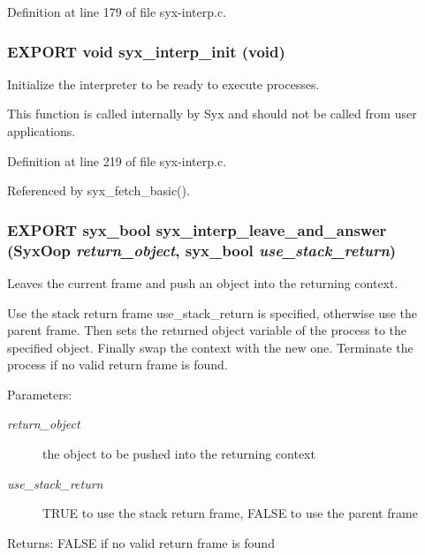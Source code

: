 Definition at line 179 of file syx-interp.c.\hypertarget{syx-interp_8h_dbf95deb73b49620ce9b5c884e6cbcae}{
\subsubsection{\setlength{\rightskip}{0pt plus 5cm}EXPORT void syx\_\-interp\_\-init (void)}}
\label{syx-interp_8h_dbf95deb73b49620ce9b5c884e6cbcae}


Initialize the interpreter to be ready to execute processes.

This function is called internally by Syx and should not be called from user applications. 

Definition at line 219 of file syx-interp.c.

Referenced by syx\_\-fetch\_\-basic().\hypertarget{syx-interp_8h_f677bca3ba7ff8315ce0b1406b7a97b5}{
\subsubsection{\setlength{\rightskip}{0pt plus 5cm}EXPORT {\bf syx\_\-bool} syx\_\-interp\_\-leave\_\-and\_\-answer ({\bf SyxOop} {\em return\_\-object}, \/  {\bf syx\_\-bool} {\em use\_\-stack\_\-return})}}
\label{syx-interp_8h_f677bca3ba7ff8315ce0b1406b7a97b5}


Leaves the current frame and push an object into the returning context.

Use the stack return frame use\_\-stack\_\-return is specified, otherwise use the parent frame. Then sets the returned object variable of the process to the specified object. Finally swap the context with the new one. Terminate the process if no valid return frame is found.

\begin{Desc}
\item[Parameters:]
\begin{description}
\item[{\em return\_\-object}]the object to be pushed into the returning context \item[{\em use\_\-stack\_\-return}]TRUE to use the stack return frame, FALSE to use the parent frame \end{description}
\end{Desc}
\begin{Desc}
\item[Returns:]FALSE if no valid return frame is found \end{Desc}


